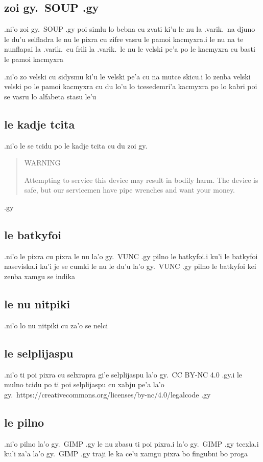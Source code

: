 \documentclass{report}
\begin{document}
\subsection{zoi gy.\ SOUP .gy}
.ni'o zoi gy.\ SOUP .gy poi simlu lo bebna cu zvati ki'u le nu la .varik.\ na djuno le du'u selfladra le nu le pixra cu zifre vasru le pamoi kacmyxra\@  .i le nu na te nunflapai la .varik.\ cu frili la .varik.\ le nu le velski pe'a po le kacmyxra cu basti le pamoi kacmyxra

.ni'o zo velski cu sidysmu ki'u le velski pe'a cu na mutce skicu\@  .i lo zenba velski velski po le pamoi kacmyxra cu du lo'u lo tcesedemri'a kacmyxra po lo kabri poi se vasru lo alfabeta stasu le'u

\subsection{le kadje tcita}
.ni'o le se tcidu po le kadje tcita cu du zoi gy.
\begin{quote}
	WARNING

	Attempting to service this device may result in bodily harm.  The device is safe, but our servicemen have pipe wrenches and want your money.
\end{quote}
.gy

\subsection{le batkyfoi}
.ni'o le pixra cu pixra le nu la'o gy.\ VUNC .gy pilno le batkyfoi\@  .i ku'i le batkyfoi naseviska\@  .i ku'i je se cumki le nu le du'u la'o gy.\ VUNC .gy pilno le batkyfoi kei zenba xamgu se indika

\subsection{le nu nitpiki}
.ni'o lo nu nitpiki cu za'o se nelci

\subsection{le selplijaspu}
.ni'o ti poi pixra cu selxrapra gi'e selplijaspu la'o gy.\ CC BY-NC 4.0 .gy\@ .i le mulno tcidu po ti poi selplijaspu cu xabju pe'a la'o gy.\ https://creativecommons.org/licenses/by-nc/4.0/legalcode .gy

\subsection{le pilno}
.ni'o pilno la'o gy.\ GIMP .gy le nu zbasu ti poi pixra\@  .i la'o gy.\ GIMP .gy tcexla\@  .i ku'i za'a la'o gy.\ GIMP .gy traji le ka ce'u xamgu pixra bo fingubni bo proga
\end{document}
